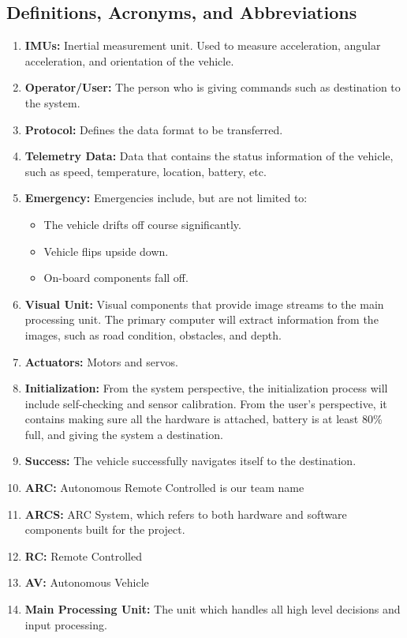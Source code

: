 \documentclass[compsoc,draftclsnofoot,onecolumn,10pt]{IEEEtran}
\begin{document}
\subsection{Definitions, Acronyms, and Abbreviations} %
\begin{enumerate}
	\item \textbf{IMUs:} Inertial measurement unit. Used to measure acceleration, angular acceleration, and orientation of the vehicle.
	\item \textbf{Operator/User:} The person who is giving commands such as destination to the system.
	\item \textbf{Protocol:} Defines the data format to be transferred.
	\item \textbf{Telemetry Data:} Data that contains the status information of the vehicle, such as speed, temperature, location, battery, etc.
	\item \textbf{Emergency:} Emergencies include, but are not limited to: 
	\begin{itemize}
		\item The vehicle drifts off course significantly.
		\item Vehicle flips upside down.
		\item On-board components fall off.
	\end{itemize}
	\item \textbf{Visual Unit:} Visual components that provide image streams to the main processing unit. 
	The primary computer will extract information from the images, such as road condition, obstacles, and depth. 
	\item \textbf{Actuators:} Motors and servos.
	\item \textbf{Initialization:} From the system perspective, the initialization process will include self-checking and sensor calibration. 
	From the user's perspective, it contains making sure all the hardware is attached, battery is at least 80\% full, and giving the system a destination. 
	\item \textbf{Success:} The vehicle successfully navigates itself to the destination.
	\item \textbf{ARC:} Autonomous Remote Controlled is our team name
	\item \textbf{ARCS:} ARC System, which refers to both hardware and software components built for the project.
	\item \textbf{RC:} Remote Controlled
	\item \textbf{AV:} Autonomous Vehicle
	\item \textbf{Main Processing Unit:} The unit which handles all high level decisions and input processing. 

\end{enumerate}
\end{document}

